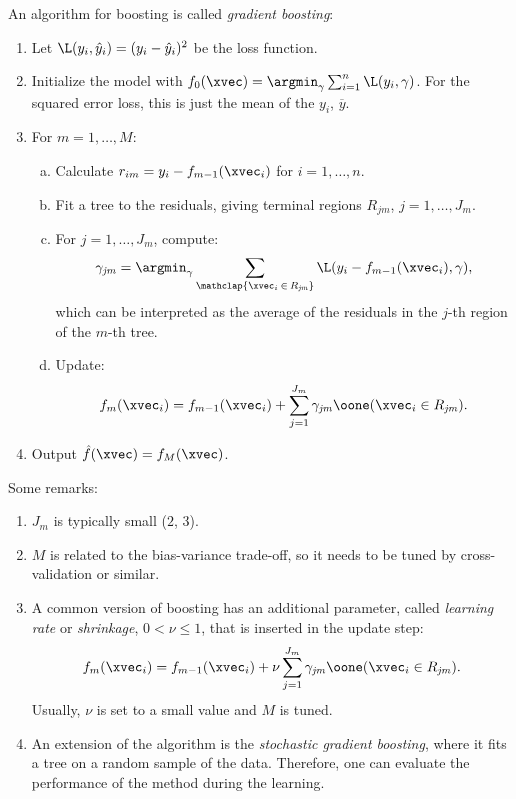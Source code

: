 An algorithm for boosting is called \emph{gradient boosting}:
\begin{enumerate}
    \item Let $\L(y_i, \hat{y}_i) = (y_i - \hat{y}_i)^2$ be the loss function.
    \item Initialize the model with $f_0(\xvec) = \argmin_\gamma \sum_{i=1}^n \L(y_i, \gamma)$. For the squared error loss, this is just the mean of the $y_i$, $\overbar{y}$.
    \item For $m = 1, \dots, M$:
    \begin{enumerate}[a.]
        \item Calculate $r_{im} = y_i - f_{m-1}(\xvec_i)$ for $i = 1, \dots, n$.
        \item Fit a tree to the residuals, giving terminal regions $R_{\mathit{jm}}$, $j = 1, \dots, J_m$.
        \item For $j = 1, \dots, J_m$, compute:
        \begin{equation}
            \gamma_{\mathit{jm}} = \argmin_\gamma \sum_{\mathclap{\xvec_i\,\in\,R_{\mathit{jm}}}} \L(y_i - f_{m-1}(\xvec_i), \gamma),
        \end{equation}
        which can be interpreted as the average of the residuals in the $j$-th region of the $m$-th tree.
        \item Update:
        \begin{equation}
            f_m(\xvec_i) = f_{m-1}(\xvec_i) + \sum_{j=1}^{J_m} \gamma_{\mathit{jm}} \oone(\xvec_i \in R_{\mathit{jm}}).
        \end{equation}
    \end{enumerate}
    \item Output $\hat{f}(\xvec) = f_M(\xvec)$.       
\end{enumerate}

Some remarks:
\begin{enumerate}[beginpenalty=10000]
    \item $J_m$ is typically small ($2$, $3$).
    \item $M$ is related to the bias-variance trade-off, so it needs to be tuned by cross-validation or similar.
    \item A common version of boosting has an additional parameter, called \emph{learning rate} or \emph{shrinkage}, $0 < \nu \leq 1$, that is inserted in the update step:
    \begin{equation}
        f_m(\xvec_i) = f_{m-1}(\xvec_i) + \nu \sum_{j=1}^{J_m} \gamma_{\mathit{jm}} \oone(\xvec_i \in R_{\mathit{jm}}).
    \end{equation}
    Usually, $\nu$ is set to a small value and $M$ is tuned.
    \item An extension of the algorithm is the \emph{stochastic gradient boosting}, where it fits a tree on a random sample of the data. Therefore, one can evaluate the performance of the method during the learning.
\end{enumerate}